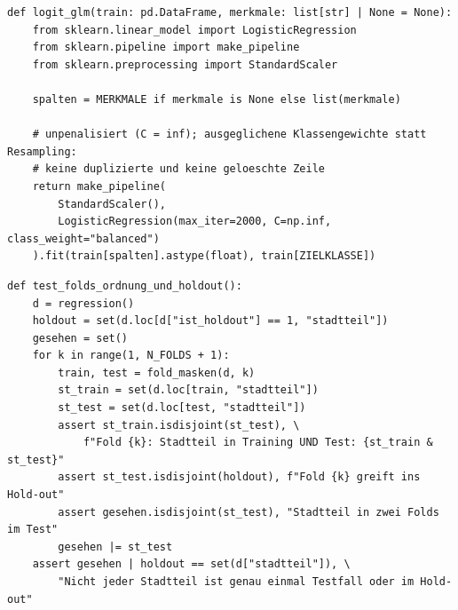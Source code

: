 \begin{lstlisting}[style=pythonstil,
  label={lst:logit},
  caption={Multinomiales Logit, Stufe 2 der Struktur
           (\texttt{vorpruefung/v1\_baselines.py}, Z.~111--139, gekürzt)}]
def logit_glm(train: pd.DataFrame, merkmale: list[str] | None = None):
    from sklearn.linear_model import LogisticRegression
    from sklearn.pipeline import make_pipeline
    from sklearn.preprocessing import StandardScaler

    spalten = MERKMALE if merkmale is None else list(merkmale)

    # unpenalisiert (C = inf); ausgeglichene Klassengewichte statt Resampling:
    # keine duplizierte und keine geloeschte Zeile
    return make_pipeline(
        StandardScaler(),
        LogisticRegression(max_iter=2000, C=np.inf, class_weight="balanced")
    ).fit(train[spalten].astype(float), train[ZIELKLASSE])
\end{lstlisting}



\begin{lstlisting}[style=pythonstil,
  label={lst:test-folds},
  caption={Prüfung der Stadtteiltrennung an der erzeugten Datei
           (\texttt{tests/test\_aufbereitung.py}, Z.~134--156, gekürzt)}]
def test_folds_ordnung_und_holdout():
    d = regression()
    holdout = set(d.loc[d["ist_holdout"] == 1, "stadtteil"])
    gesehen = set()
    for k in range(1, N_FOLDS + 1):
        train, test = fold_masken(d, k)
        st_train = set(d.loc[train, "stadtteil"])
        st_test = set(d.loc[test, "stadtteil"])
        assert st_train.isdisjoint(st_test), \
            f"Fold {k}: Stadtteil in Training UND Test: {st_train & st_test}"
        assert st_test.isdisjoint(holdout), f"Fold {k} greift ins Hold-out"
        assert gesehen.isdisjoint(st_test), "Stadtteil in zwei Folds im Test"
        gesehen |= st_test
    assert gesehen | holdout == set(d["stadtteil"]), \
        "Nicht jeder Stadtteil ist genau einmal Testfall oder im Hold-out"
\end{lstlisting}



